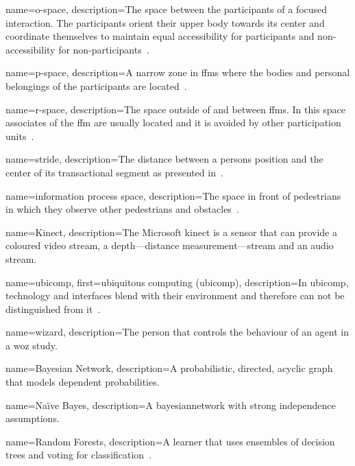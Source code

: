 {
	name={o-space},
	description={The space between the participants of a \gls{focused interaction}. The participants orient their upper body towards its center and coordinate themselves to maintain equal accessibility for participants and non-accessibility for \glspl{non-participant}~\cite[p. 243]{Ciolek1980}. }
}

{
	name={p-space},
	description={A narrow zone in \glspl{ffm} where the bodies and personal belongings of the participants are located~\cite[p. 259]{Ciolek1980}.}
}

{
	name={r-space},
	description={The space outside of and between \glspl{ffm}. In this space associates of the \gls{ffm} are usually located and it is avoided by other \glspl{participation unit}~\cite[p. 260]{Ciolek1980}.}
}

{
	name={stride},
	description={The distance between a persons position and the center of its \gls{transactional segment} as presented in~\cite[]{Setti2015}.}
}

{
	name={information process space},
	description={The space in front of pedestrians in which they observe other pedestrians and obstacles~\cite[]{Kitazawa2010}.}
}

{
	name={Kinect},
	description={The Microsoft \gls{kinect} is a sensor that can provide a coloured video stream, a depth---distance measurement---stream and an audio stream.}
}

{
	name={ubicomp},
	first={ubiquitous computing (ubicomp)},
	description={In \acrfull{ubicomp}, technology and interfaces blend with their environment and therefore can not be distinguished from it~\cite[]{Greenberg1991}.}
}

{
	name={wizard},
	description={The person that controls the behaviour of an agent in a \gls{woz} study.}
}

{
	name={Bayesian Network},
	description={A probabilistic, directed, acyclic graph that models dependent probabilities.}
}

{
	name={Na{\"i}ve Bayes},
	description={A \gls{bayesiannetwork} with strong independence assumptions.}
}

{
	name={Random Forests},
	description={A learner that uses ensembles of decision trees and voting for classification~\cite[]{Breiman2001}.}
}

